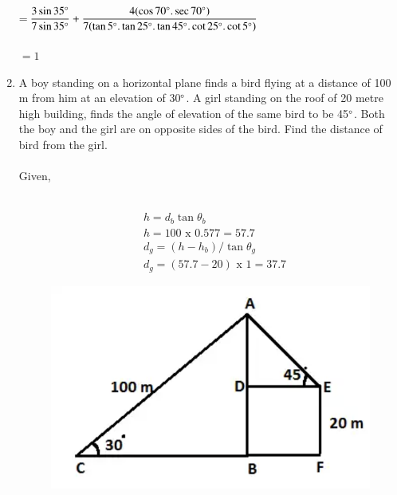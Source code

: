 \documentclass[journal,12pt,twocolumn]{IEEEtran}
\renewcommand\thesection{\arabic{section}}
\begin{document}
\begin{enumerate}[label=\thesection.\arabic*.,ref=\thesection.\theenumi]
 =$\displaystyle\frac{3\sin35\degree}{7\sin35\degree}+\displaystyle\frac{4(\cos70\degree.\sec70\degree)}{7(\tan5\degree.\tan25\degree.\tan45\degree.\cot25\degree.\cot5\degree)}$\\ \\ 
 $=1$
 \item A boy standing on a horizontal plane finds a bird flying at a distance of 100 m from him at an elevation of 30$\degree$. A girl standing on the roof of 20 metre high building, finds the angle of elevation of the same bird to be 45$\degree$. Both the boy and the girl are on opposite sides of the bird. Find the distance of bird from the girl.\\
 \solution\\
 Given, \\  
\begin{table}[ht]
 \centering
 \caption{}
 \end{table}\\
\begin{align}
& h = d_b\tan \theta_b\\
& h = 100 \text{ x } 0.577= 57.7\\
& d_g = (h - h_b) /\tan \theta_g\\
& d_g = (57.7-20) \text{ x } 1 = 37.7
\end{align}
\begin{figure}[h!]
	\centering
    \includegraphics[width=0.75\columnwidth]{t_3.png}
    \caption{}
    \label{t_3}
\end{figure}
\end{enumerate}
\end{document}
